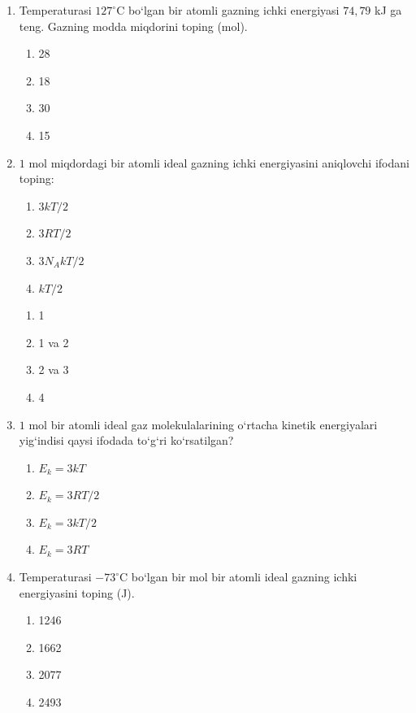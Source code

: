 \begin{enumerate}
\item Temperaturasi $127^\circ$C bo‘lgan bir atomli gazning ichki energiyasi $74,79$ kJ ga teng. Gazning modda miqdorini toping (mol).
\begin{enumerate}[label=\Alph*)]
\item 28
\item 18
\item 30
\item 15

\end{enumerate}

\item $1$ mol miqdordagi bir atomli ideal gazning ichki energiyasini aniqlovchi ifodani toping:
\begin{enumerate}
\item $3kT/2$
\item $3RT/2$
\item $3N_AkT/2$
\item $kT/2$
\end{enumerate}
\begin{enumerate}[label=\Alph*)]
\item 1
\item 1 va 2
\item 2 va 3
\item 4

\end{enumerate}

\item $1$ mol bir atomli ideal gaz molekulalarining o‘rtacha kinetik energiyalari yig‘indisi qaysi ifodada to‘g‘ri ko‘rsatilgan?
\begin{enumerate}[label=\Alph*)]
\item $E_k=3kT$
\item $E_k=3RT/2$
\item $E_k=3kT/2$
\item $E_k=3RT$

\end{enumerate}

\item Temperaturasi $-73^\circ$C bo‘lgan bir mol bir atomli ideal gazning ichki energiyasini toping (J).
\begin{enumerate}[label=\Alph*)]
\item 1246
\item 1662
\item 2077
\item 2493

\end{enumerate}


\end{enumerate}

